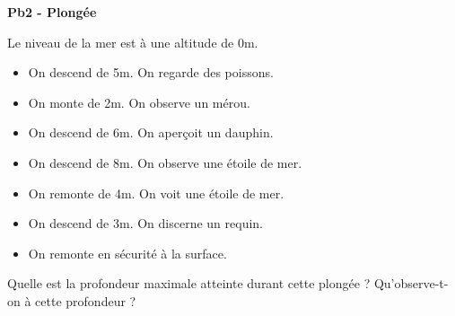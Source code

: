 \begin{minipage}[t]{0.5\textwidth}
\textbf{Pb2 - Plongée}

Le niveau de la mer est à une altitude de 0m.
\begin{itemize}[label={$\bullet$}]
  \item On descend de 5m. On regarde des poissons.
  \item On monte de 2m. On observe un mérou.  
  \item On descend de 6m. On aperçoit un dauphin.
  \item On descend de 8m. On observe une étoile de mer.
  \item On remonte de 4m. On voit une étoile de mer.
  \item On descend de 3m.  On discerne un requin.
  \item On remonte en sécurité à la surface.
\end{itemize} 
Quelle est la profondeur maximale atteinte durant cette plongée ? Qu'observe-t-on à cette profondeur ?
\end{minipage}
\begin{minipage}[t]{0.5\textwidth}
  \Pointilles[14]
\end{minipage}  



